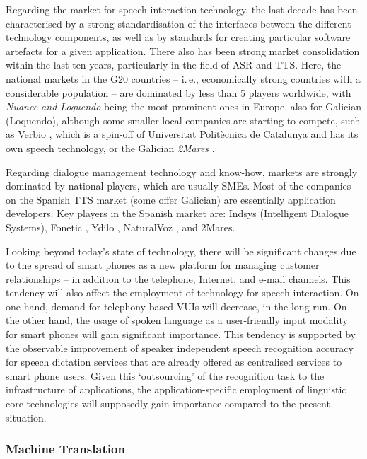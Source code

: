 \begin{multicols}{2}
Regarding the market for speech interaction technology, the last decade has been characterised by a strong standardisation of the interfaces between the different technology components, as well as by standards for creating particular software artefacts for a given application. There also has been strong market consolidation within the last ten years, particularly in the field of ASR and TTS. Here, the national markets in the G20 countries – i.\,e., economically strong countries with a considerable population -- are dominated by less than 5 players worldwide, with \textit{Nuance and Loquendo} being the most prominent ones in Europe, also for Galician (Loquendo), although some smaller local companies are starting to compete, such as Verbio \cite{GAL-Nota25} , which is a spin-off of Universitat Politècnica de Catalunya and has its own speech technology, or the Galician \textit{2Mares} \cite{GAL-Nota26}. 

Regarding dialogue management technology and know-how, markets are strongly dominated by national players, which are usually SMEs.
Most of the companies on the Spanish TTS market (some offer Galician) are essentially application developers. Key players in the Spanish market are: Indsys \cite{GAL-Nota27} (Intelligent Dialogue Systems), Fonetic \cite{GAL-Nota28}, Ydilo \cite{GAL-Nota29}, NaturalVoz \cite{GAL-Nota30}, and 2Mares.

Looking beyond today’s state of technology, there will be significant changes due to the spread of smart phones as a new platform for managing customer relationships – in addition to the telephone, Internet, and e-mail channels. This tendency will also affect the employment of technology for speech interaction. On one hand, demand for telephony-based VUIs will decrease, in the long run. On the other hand, the usage of spoken language as a user-friendly input modality for smart phones will gain significant importance. This tendency is supported by the observable improvement of speaker independent speech recognition accuracy for speech dictation services that are already offered as centralised services to smart phone users. Given this ‘outsourcing’ of the recognition task to the infrastructure of applications, the application-specific employment of linguistic core technologies will supposedly gain importance compared to the present situation. 

\subsubsection{Machine Translation}


\end{multicols}
